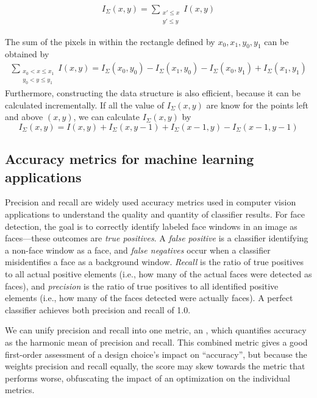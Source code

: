 \begin{align}
I_\Sigma (x,y) =   \sum_{\substack{x' \leq x \\ y' \leq y}}I(x,y)
\end{align}

The sum of the pixels in within the rectangle defined by $x_0,x_1,y_0,y_1$ can be obtained by
\begin{align}
\sum_{\substack{ x_0 < x \leq x_1\\ y_0 < y \leq y_1} }I(x,y) = I_\Sigma(x_0,y_0) - I_\Sigma(x_1,y_0)-I_\Sigma(x_0,y_1)+I_\Sigma(x_1,y_1)
\end{align}
Furthermore, constructing the data structure is also efficient, because it can be calculated incrementally. If
all the value of $I_\Sigma(x,y)$ are know for the points left and above $(x,y)$, we can
calculate $I_\Sigma(x,y)$ by
\begin{equation}
I_\Sigma (x,y) = I(x,y) + I_\Sigma (x,y-1)+I_\Sigma (x-1,y)-I_\Sigma (x-1,y-1)
\end{equation}


\subsection{Accuracy metrics for machine learning applications}

Precision and recall are widely used accuracy metrics used in computer vision applications to understand the quality and quantity of classifier results. For face detection, the goal is to correctly identify labeled face windows in an image as faces---these outcomes are \textit{true positives}. A \textit{false positive} is a classifier identifying a non-face window as a face, and \textit{false negatives} occur when a classifier misidentifies a face as a background window. \emph{Recall} is the ratio of true positives to all actual positive elements (i.e., how many of the actual faces were detected as faces), and \emph{precision} is the ratio of true positives to all identified positive elements (i.e., how many of the faces detected were actually faces). A perfect classifier achieves both precision and recall of 1.0.

We can unify precision and recall into one metric, an \textit{\fscore}, which quantifies accuracy as the harmonic mean of precision and recall.
This combined metric
gives a good first-order assessment of a design choice's impact on ``accuracy'', but because the \fscore  weights precision and recall equally, the score may skew towards the metric that performs worse, obfuscating the impact of an optimization on the individual metrics.

